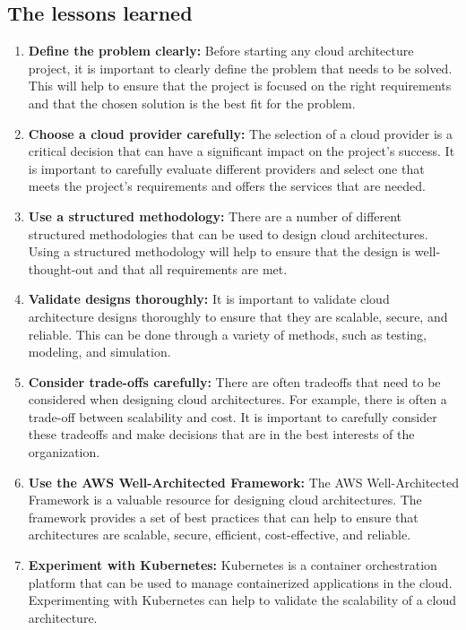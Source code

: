 \documentclass{article}
\begin{document}
\subsection{The lessons learned}
\begin{enumerate}
    \item \textbf{Define the problem clearly:} Before starting any cloud architecture project, it is important to clearly define the problem that needs to be solved. This will help to ensure that the project is focused on the right requirements and that the chosen solution is the best fit for the problem.
    \item \textbf{Choose a cloud provider carefully:} The selection of a cloud provider is a critical decision that can have a significant impact on the project's success. It is important to carefully evaluate different providers and select one that meets the project's requirements and offers the services that are needed.

    \item \textbf{Use a structured methodology:} There are a number of different structured methodologies that can be used to design cloud architectures. Using a structured methodology will help to ensure that the design is well-thought-out and that all requirements are met.

    \item \textbf{Validate designs thoroughly:} It is important to validate cloud architecture designs thoroughly to ensure that they are scalable, secure, and reliable. This can be done through a variety of methods, such as testing, modeling, and simulation.

    \item \textbf{Consider trade-offs carefully:} There are often tradeoffs that need to be considered when designing cloud architectures. For example, there is often a trade-off between scalability and cost. It is important to carefully consider these tradeoffs and make decisions that are in the best interests of the organization.

    \item \textbf{Use the AWS Well-Architected Framework:} The AWS Well-Architected Framework is a valuable resource for designing cloud architectures. The framework provides a set of best practices that can help to ensure that architectures are scalable, secure, efficient, cost-effective, and reliable.

    \item \textbf{Experiment with Kubernetes:} Kubernetes is a container orchestration platform that can be used to manage containerized applications in the cloud. Experimenting with Kubernetes can help to validate the scalability of a cloud architecture.


\end{enumerate}
\end{document}
